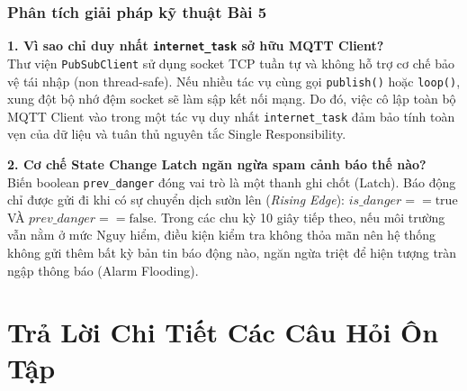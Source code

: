 \subsubsection{Phân tích giải pháp kỹ thuật Bài 5}
\begin{tcolorbox}[colback=blue!5,colframe=blue!75!black,title=\textbf{Giải thích quyền sở hữu tác vụ và cơ chế chống lặp báo động}]
\textbf{1. Vì sao chỉ duy nhất \texttt{internet\_task} sở hữu MQTT Client?} \\
Thư viện \texttt{PubSubClient} sử dụng socket TCP tuần tự và không hỗ trợ cơ chế bảo vệ tái nhập (non thread-safe). Nếu nhiều tác vụ cùng gọi \texttt{publish()} hoặc \texttt{loop()}, xung đột bộ nhớ đệm socket sẽ làm sập kết nối mạng. Do đó, việc cô lập toàn bộ MQTT Client vào trong một tác vụ duy nhất \texttt{internet\_task} đảm bảo tính toàn vẹn của dữ liệu và tuân thủ nguyên tắc Single Responsibility.

\textbf{2. Cơ chế State Change Latch ngăn ngừa spam cảnh báo thế nào?} \\
Biến boolean \texttt{prev\_danger} đóng vai trò là một thanh ghi chốt (Latch). Báo động chỉ được gửi đi khi có sự chuyển dịch sườn lên (\textit{Rising Edge}): $is\_danger == \text{true}$ VÀ $prev\_danger == \text{false}$. Trong các chu kỳ 10 giây tiếp theo, nếu môi trường vẫn nằm ở mức Nguy hiểm, điều kiện kiểm tra không thỏa mãn nên hệ thống không gửi thêm bất kỳ bản tin báo động nào, ngăn ngừa triệt để hiện tượng tràn ngập thông báo (Alarm Flooding).
\end{tcolorbox}

\newpage
\section{Trả Lời Chi Tiết Các Câu Hỏi Ôn Tập}

